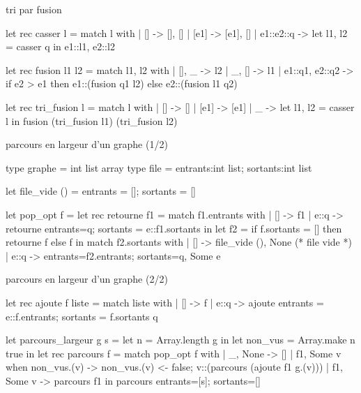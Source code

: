 

\begin{adjustwidth}{-3cm}{-3cm}


\begin{implementation}{tri par fusion}
    \begin{lstOCaml}
    let rec casser l =
        match l with
        | [] -> [], []
        | [e1] -> [e1], []
        | e1::e2::q -> 
            let l1, l2 = casser q in
            e1::l1, e2::l2

    let rec fusion l1 l2 = 
        match l1, l2 with
        | [], _ -> l2
        | _, [] -> l1
        | e1::q1, e2::q2 ->
            if e2 > e1 then
                e1::(fusion q1 l2)
            else
                e2::(fusion l1 q2)

    let rec tri_fusion l =
        match l with
        | [] -> []
        | [e1] -> [e1]
        | _ -> 
            let l1, l2 = casser l in
            fusion (tri_fusion l1) (tri_fusion l2)
    \end{lstOCaml}
\end{implementation}

\begin{implementation}{parcours en largeur d'un graphe (1/2)}
    \begin{lstOCaml}
    type graphe = int list array
    type file = {entrants:int list; sortants:int list}
        
    let file_vide () = {entrants = []; sortants = []}
                        
    let pop_opt f = 
        let rec retourne f1 =
            match f1.entrants with 
            | [] -> f1
            | e::q -> retourne {entrants=q; sortants = e::f1.sortants}
        in let f2 = if f.sortants = [] then retourne f else f
        in match f2.sortants with
        | [] -> file_vide (), None (* file vide *)
        | e::q -> {entrants=f2.entrants; sortants=q}, Some e
    \end{lstOCaml}
\end{implementation}

\begin{implementation}{parcours en largeur d'un graphe (2/2)}
    \begin{lstOCaml}
    let rec ajoute f liste = 
        match liste with 
        | [] -> f
        | e::q -> ajoute {entrants = e::f.entrants; sortants = f.sortants} q            
        
    let parcours_largeur g s = 
        let n = Array.length g in
        let non_vus = Array.make n true in
        let rec parcours f = 
            match pop_opt f with 
            | _, None -> []
            | f1, Some v when non_vus.(v) ->
                non_vus.(v) <- false;
                v::(parcours (ajoute f1 g.(v)))
            | f1, Some v ->
                parcours f1
        in parcours {entrants=[s]; sortants=[]}
    \end{lstOCaml}
\end{implementation}


\end{adjustwidth}
